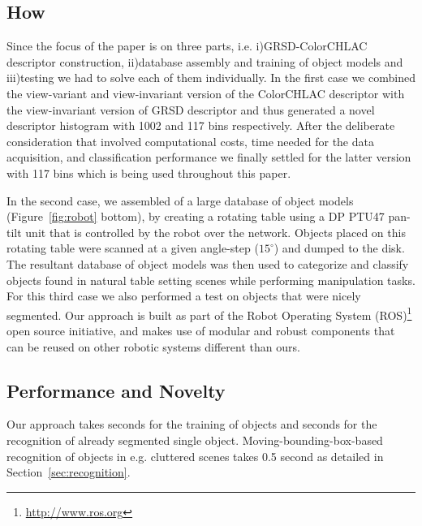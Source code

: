 \documentclass[conference]{sty/IEEEtran}
\begin{document}
\subsection{How}
Since the focus of the paper is on three parts, i.e. i)GRSD-ColorCHLAC descriptor
construction, ii)database assembly and training of object models and iii)testing
we had to solve each of them individually. In the first case we combined
the view-variant and view-invariant version of the ColorCHLAC descriptor with the
view-invariant version of GRSD descriptor and thus generated a novel descriptor
histogram with 1002 and 117 bins respectively. After the deliberate consideration
that involved computational costs, time needed for the data acquisition, and
classification performance we finally settled for the latter version with 117
bins which is being used throughout this paper.

In the second case, we assembled of a large database of
object models (Figure~\ref{fig:robot} bottom), by creating a rotating
table using a DP PTU47 pan-tilt unit that is controlled by the robot over the
network.  Objects placed on this rotating table were scanned at a given
angle-step ($15^\circ$) and dumped to the disk. The resultant database of
object models was then used to categorize and classify objects found in
natural table setting scenes while performing manipulation
tasks.  For this third case we also performed a test on objects that were
nicely segmented. Our approach is built as part of the Robot Operating System
(ROS)\footnote{\url{http://www.ros.org}} open source initiative, and makes
use of modular and robust components that can be reused on other robotic
systems different than ours.



\subsection{Performance and Novelty}
Our approach takes  seconds for the training of objects and  seconds
for the recognition of already segmented single object. Moving-bounding-box-based
recognition of objects in e.g. cluttered scenes takes 0.5 second as detailed
in Section~\ref{sec:recognition}.
\end{document}
